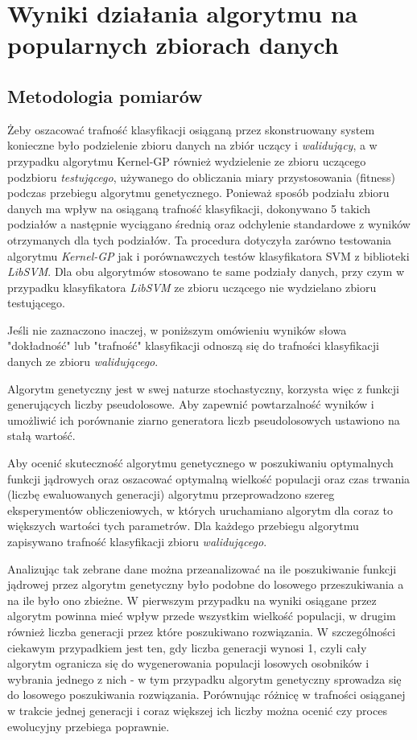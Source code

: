 
\chapter{Wyniki działania algorytmu na popularnych zbiorach danych}

\section{Metodologia pomiarów}
	Żeby oszacować trafność klasyfikacji osiąganą przez skonstruowany system konieczne było podzielenie zbioru danych na zbiór uczący i \emph{walidujący}, a w przypadku algorytmu Kernel-GP również wydzielenie ze zbioru uczącego podzbioru \emph{testującego}, używanego do obliczania miary przystosowania (fitness) podczas przebiegu algorytmu genetycznego. Ponieważ sposób podziału zbioru danych ma wpływ na osiąganą trafność klasyfikacji, dokonywano 5 takich podziałów a następnie wyciągano średnią oraz odchylenie standardowe z wyników otrzymanych dla tych podziałów. Ta procedura dotyczyła zarówno testowania algorytmu \emph{Kernel-GP} jak i porównawczych testów klasyfikatora SVM z biblioteki \emph{LibSVM}. Dla obu algorytmów stosowano te same podziały danych, przy czym w przypadku klasyfikatora \emph{LibSVM} ze zbioru uczącego nie wydzielano zbioru testującego.
	
	Jeśli nie zaznaczono inaczej, w poniższym omówieniu wyników słowa "dokładność" lub "trafność" klasyfikacji odnoszą się do trafności klasyfikacji danych ze zbioru \emph{walidującego}.
	
	Algorytm genetyczny jest w swej naturze stochastyczny, korzysta więc z funkcji generujących liczby pseudolosowe. Aby zapewnić powtarzalność wyników i umożliwić ich porównanie ziarno generatora liczb pseudolosowych ustawiono na stałą wartość.

	Aby ocenić skuteczność algorytmu genetycznego w poszukiwaniu optymalnych funkcji jądrowych oraz oszacować optymalną wielkość populacji oraz czas trwania (liczbę ewaluowanych generacji) algorytmu przeprowadzono szereg eksperymentów obliczeniowych, w których uruchamiano algorytm dla coraz to większych wartości tych parametrów. Dla każdego przebiegu algorytmu zapisywano trafność klasyfikacji zbioru \emph{walidującego}.

	Analizując tak zebrane dane można przeanalizować na ile poszukiwanie funkcji jądrowej przez algorytm genetyczny było podobne do losowego przeszukiwania a na ile było ono zbieżne. W pierwszym przypadku na wyniki osiągane przez algorytm powinna mieć wpływ przede wszystkim wielkość populacji, w drugim również liczba generacji przez które poszukiwano rozwiązania. W szczególności ciekawym przypadkiem jest ten, gdy liczba generacji wynosi 1, czyli cały algorytm ogranicza się do wygenerowania populacji losowych osobników i wybrania jednego z nich - w tym przypadku algorytm genetyczny sprowadza się do losowego poszukiwania rozwiązania. Porównując różnicę w trafności osiąganej w trakcie jednej generacji i coraz większej ich liczby można ocenić czy proces ewolucyjny przebiega poprawnie. 
	
